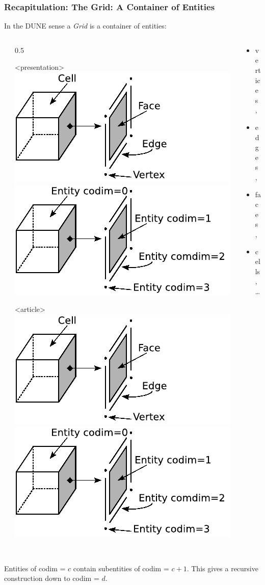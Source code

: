 \documentclass[aspectratio=169,11pt]{beamer}
\theoremstyle{definition}
\begin{document}
\begin{frame} \frametitle{Recapitulation: The Grid: A Container of Entities}

  In the DUNE sense a \emph{Grid} is a container of entities:

  \begin{columns}
    \begin{column}{5mm}
    \end{column}
    \begin{column}{0.5\linewidth-5mm}
      \begin{onlyenv}<presentation>
        \includegraphics<1-2>[width=\linewidth]{entities}
        \includegraphics<3->[width=\linewidth]{entities_cd}
      \end{onlyenv}
      \begin{onlyenv}<article>
        \vspace*{2ex}
        ~\hfill\includegraphics[width=0.4\linewidth]{entities}\hfill
        \includegraphics[width=0.4\linewidth]{entities_cd}\hfill~
      \end{onlyenv}
    \end{column}\hfill
    \begin{column}{0.5\linewidth}
      \begin{itemize}
      \item vertices ,
      \item edges ,
      \item faces ,
      \item cells , \ldots{}
      \end{itemize}
    \end{column}
  \end{columns}

  Entities of codim = $c$ contain subentities of codim = $c+1$. This
  gives a recursive construction down to codim = $d$.

\end{frame}
\end{document}
